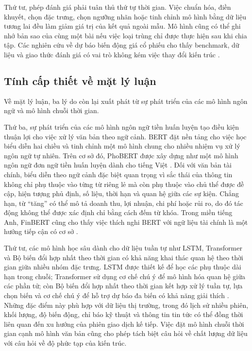 \documentclass[12pt, a4paper, oneside]{report}
\begin{document}
Thứ tư, phép đánh giá phải tuân thủ thứ tự thời gian. Việc chuẩn hóa, điền khuyết, chọn
đặc trưng, chọn ngưỡng nhãn hoặc tinh chỉnh mô hình bằng dữ liệu tương lai đều làm giảm
giá trị của kết quả ngoài mẫu. Mô hình cũng có thể ghi nhớ bản sao của cùng một bài nếu
việc loại trùng chỉ được thực hiện sau khi chia tập. Các nghiên cứu về dự báo biến động
giá cổ phiếu cho thấy benchmark, dữ liệu và giao thức đánh giá có vai trò không kém
việc thay đổi kiến trúc \cite{Feng2018_181009936v2,Chen2021_210708721v1}.


\subsection{Tính cấp thiết về mặt lý luận}

Về mặt lý luận, ba lý do còn lại xuất phát từ sự phát triển của các mô hình ngôn ngữ
và mô hình chuỗi thời gian.

Thứ ba, sự phát triển của các mô hình ngôn ngữ tiền huấn luyện tạo điều kiện thuận lợi
cho việc xử lý văn bản theo ngữ cảnh. BERT đặt nền tảng cho việc học biểu diễn hai
chiều và tinh chỉnh một mô hình chung cho nhiều nhiệm vụ xử lý ngôn ngữ tự nhiên. Trên
cơ sở đó, PhoBERT được xây dựng như một mô hình ngôn ngữ đơn ngữ tiền huấn luyện dành
cho tiếng Việt \cite{Nguyen2020_200300744v3}. Đối với văn bản tài chính, biểu diễn theo
ngữ cảnh đặc biệt quan trọng vì sắc thái của thông tin không chỉ phụ thuộc vào từng từ
riêng lẻ mà còn phụ thuộc vào chủ thể được đề cập, hiện tượng phủ định, số liệu, thời
hạn và quan hệ giữa các sự kiện. Chẳng hạn, từ ``tăng'' có thể mô tả doanh thu, lợi
nhuận, chi phí hoặc rủi ro, do đó tác động không thể được xác định chỉ bằng cách đếm
từ khóa. Trong miền tiếng Anh, FinBERT cũng cho thấy việc thích nghi BERT với ngữ liệu
tài chính là một hướng tiếp cận có cơ sở \cite{Yang2020_200608097v2}.

Thứ tư, các mô hình học sâu dành cho dữ liệu tuần tự như LSTM, Transformer và Bộ biến
đổi hợp nhất theo thời gian có khả năng khai thác quan hệ theo thời gian giữa nhiều
nhóm đặc trưng. LSTM được thiết kế để học các phụ thuộc dài hạn trong chuỗi; Transformer
sử dụng cơ chế chú ý để mô hình hóa quan hệ giữa các phần tử; còn Bộ biến đổi hợp nhất
theo thời gian kết hợp xử lý tuần tự, lựa chọn biến và cơ chế chú ý để hỗ trợ dự báo đa
biến có khả năng giải thích \cite{Feng2018_181009936v2,Omranpour2024_241210540v1}.
Những đặc điểm này phù hợp với dữ liệu thị trường, trong đó lịch sử nhiều phiên, khối
lượng, độ biến động, chỉ báo kỹ thuật và thông tin tin tức có thể đồng thời liên quan
đến xu hướng của phiên giao dịch kế tiếp. Việc đặt mô hình chuỗi thời gian cạnh mô hình
văn bản cũng cho phép tách biệt câu hỏi về chất lượng dữ liệu với câu hỏi về độ phức
tạp của kiến trúc.
\end{document}
